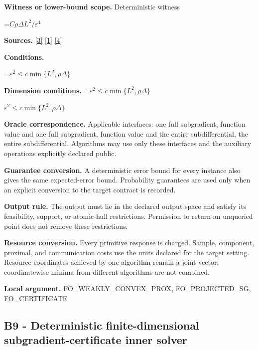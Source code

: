 \documentclass[10pt,a4paper]{article}
\newcommand{\AtlasMath}[1]{\par\begingroup\centering\setbox0=\hbox{$\displaystyle #1$}\ifdim\wd0>1.4\linewidth\typeout{ATLAS WIDE FORMULA: \the\wd0}\fi\ifdim\wd0>\linewidth\resizebox{\linewidth}{!}{\box0}\else\box0\fi\par\endgroup}
\newcommand{\AtlasInlineMath}[1]{\begingroup\setbox0=\hbox{$#1$}\ifdim\wd0>.4\linewidth\endgroup\AtlasMath{#1}\else\endgroup$#1$\fi}
\begin{document}
\textbf{Witness or lower-bound scope.} Deterministic witness



\AtlasMath{C\rho\Delta L^2/\varepsilon^4}


\textbf{Sources.} \href{https://arxiv.org/pdf/1405.4980}{[3]} \href{https://www2.isye.gatech.edu/~nemirovs/MOR_AccuracyCertificates.pdf}{[1]} \href{https://arxiv.org/pdf/2609.20701}{[4]}



\textbf{Conditions.}
\AtlasMath{\varepsilon^2\le c\min\{L^2,\rho\Delta\}}




\textbf{Dimension conditions.} \AtlasInlineMath{\varepsilon^2\le c\min\{L^2,\rho\Delta\}}



\textbf{Oracle correspondence.} Applicable interfaces: one full subgradient, function value and one full subgradient, function value and the entire subdifferential, the entire subdifferential. Algorithms may use only these interfaces and the auxiliary operations explicitly declared public.



\textbf{Guarantee conversion.} A deterministic error bound for every instance also gives the same expected-error bound. Probability guarantees are used only when an explicit conversion to the target contract is recorded.



\textbf{Output rule.} The output must lie in the declared output space and satisfy its feasibility, support, or atomic-hull restrictions. Permission to return an unqueried point does not remove these restrictions.



\textbf{Resource conversion.} Every primitive response is charged. Sample, component, proximal, and communication costs use the units declared for the target setting. Resource coordinates achieved by one algorithm remain a joint vector; coordinatewise minima from different algorithms are not combined.



\textbf{Local argument.} FO\_WEAKLY\_CONVEX\_PROX, FO\_PROJECTED\_SG, FO\_CERTIFICATE



\subsection{B9 - Deterministic finite-dimensional subgradient-certificate inner solver}
\end{document}
